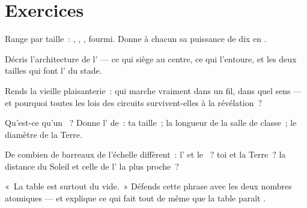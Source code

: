 \section{Exercices}

\begin{exercise}[$\star$]\label{exo:g9:atoms-to-galaxies:1}
Range par taille~: , , , fourmi. Donne à chacun sa
puissance de dix en .
\end{exercise}

\begin{exercise}[$\star$]\label{exo:g9:atoms-to-galaxies:2}
Décris l'architecture de l' --- ce qui siège au centre, ce qui
l'entoure, et les deux tailles qui font l' du stade.
\end{exercise}

\begin{exercise}[$\star$]\label{exo:g9:atoms-to-galaxies:3}
Rends la vieille plaisanterie~: qui marche vraiment dans un fil, dans
quel sens --- et pourquoi toutes les lois des circuits survivent-elles
à la révélation~?
\end{exercise}

\begin{exercise}[$\star$]\label{exo:g9:atoms-to-galaxies:4}
Qu'est-ce qu'un ~? Donne l' de~: ta
taille~; la longueur de la salle de classe~; le diamètre de la Terre.
\end{exercise}

\begin{exercise}[$\star$]\label{exo:g9:atoms-to-galaxies:5}
De combien de barreaux de l'échelle diffèrent~: l' et le ~?
toi et la Terre~? la distance du Soleil et celle de l' la plus
proche~?
\end{exercise}

\begin{exercise}[$\star$]\label{exo:g9:atoms-to-galaxies:6}
«~La table est surtout du vide.~» Défends cette phrase avec les deux
nombres atomiques --- et explique ce qui fait tout de même que la
table paraît .
\end{exercise}

